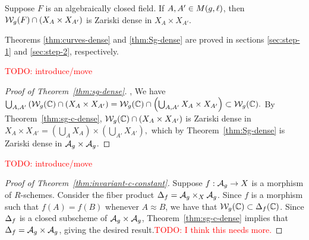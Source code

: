 \documentclass{amsart}
\begin{document}
\begin{theorem}\label{thm:Sg-dense}
  Suppose $F$ is an algebraically closed field. If $A,A' \in M(g,\ell)$, then $\mathcal{W}_g(F) \cap (X_A \times X_{A'})$ is Zariski dense in $X_A \times X_{A'}$.
\end{theorem}

Theorems \ref{thm:curves-dense} and \ref{thm:Sg-dense} are proved in sections \ref{sec:step-1} and \ref{sec:step-2}, respectively.

\textcolor{red}{TODO: introduce/move}

\begin{proof}[Proof of Theorem~\ref{thm:sg-dense}], 
We have 
$\bigcup_{A,A'} \left(\mathcal{W}_g(\mathbb{C}) \cap (X_A \times X_{A'}\right) =  \mathcal{W}_g(\mathbb{C}) \cap \left(\bigcup_{A,A'} X_A \times X_{A'}\right)
   \subset \mathcal{W}_g(\mathbb{C}).$
By Theorem~\ref{thm:sg-c-dense},
$\mathcal{W}_g(\mathbb{C}) \cap (X_A \times X_{A'})$ is Zariski dense in $X_A \times X_{A'} =
    \left(\bigcup_{A} X_A\right) \times \left(\bigcup_{A'} X_{A'}\right),$ which by Theorem~\ref{thm:Sg-dense} is Zariski dense in $\mathcal{A}_g \times \mathcal{A}_g$.
\end{proof}

\textcolor{red}{TODO: introduce/move}

\begin{proof}[Proof of Theorem~\ref{thm:invariant-c-constant}]
  Suppose $f: \mathcal{A}_g \to X$ is a morphism of $R$-schemes. Consider the fiber product $\Delta_f = \mathcal{A}_g \times_X \mathcal{A}_g$. 
Since $f$ is a morphism such that $f(A) = f(B)$ whenever $A \approx B$, we have that $\mathcal{W}_g(\mathbb{C}) \subset \Delta_f(\mathbb{C})$.
   Since $\Delta_f$ is a closed subscheme of $\mathcal{A}_g \times \mathcal{A}_g$, Theorem~\ref{thm:sg-c-dense} implies that $\Delta_f = \mathcal{A}_g \times \mathcal{A}_g$, giving the desired result.\textcolor{red}{TODO: I think this needs more.}
\end{proof}
\end{document}
